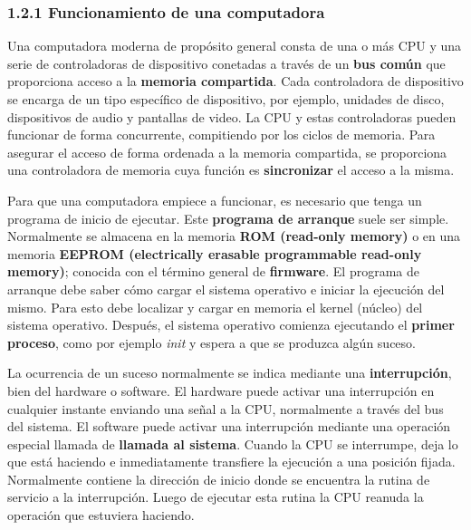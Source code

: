 \documentclass{article}
\begin{document}
\subsubsection*{1.2.1 Funcionamiento de una computadora}
Una computadora moderna de prop\'{o}sito general consta de una o m\'{a}s CPU y una serie de controladoras de dispositivo
conetadas a trav\'{e}s de un \textbf{bus com\'{u}n} que proporciona acceso a la \textbf{memoria compartida}. Cada controladora
de dispositivo se encarga de un tipo espec\'{i}fico de dispositivo, por ejemplo, unidades de disco, dispositivos de audio y  pantallas
de video. 
La CPU y estas controladoras pueden funcionar de forma concurrente, compitiendo por los ciclos de memoria. Para asegurar
el acceso de forma ordenada a la memoria compartida, se proporciona una controladora de memoria cuya funci\'{o}n es \textbf{sincronizar}
el acceso a la misma.

Para que una computadora empiece a funcionar, es necesario que tenga un programa de inicio de ejecutar. Este \textbf{programa de arranque}
suele ser simple. Normalmente se almacena en la memoria \textbf{ROM (read-only memory)} o en una memoria 
\textbf{EEPROM (electrically erasable programmable read-only memory)}; conocida con el t\'{e}rmino general de \textbf{firmware}.
El programa de arranque debe saber c\'{o}mo cargar el sistema operativo e iniciar la ejecuci\'{o}n del mismo. Para esto debe localizar
y cargar en memoria el kernel (n\'{u}cleo) del sistema operativo. Despu\'{e}s, el sistema operativo comienza ejecutando el 
\textbf{primer proceso}, como por ejemplo \textit{init} y espera a que se produzca alg\'{u}n suceso.

La ocurrencia de un suceso normalmente se indica mediante una \textbf{interrupci\'{o}n}, bien del hardware o software. El hardware
puede activar una interrupci\'{o}n en cualquier instante enviando una se\~{n}al a la CPU, normalmente a trav\'{e}s del bus del
sistema. El software puede activar una interrupci\'{o}n mediante una operaci\'{o}n especial llamada de \textbf{llamada al sistema}.
Cuando la CPU se interrumpe, deja lo que est\'{a} haciendo e inmediatamente transfiere la
ejecuci\'{o}n a una posici\'{o}n fijada. Normalmente contiene la direcci\'{o}n de inicio
donde se encuentra la rutina de servicio a la interrupci\'{o}n. Luego de ejecutar esta rutina
la CPU reanuda la operaci\'{o}n que estuviera haciendo.
\end{document}
